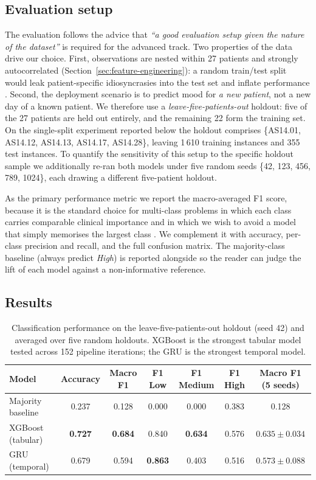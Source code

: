 \subsection{Evaluation setup}\label{sec:classification-eval}

The evaluation follows the advice that \emph{``a good evaluation setup given the nature of the dataset''} is required for the advanced track. Two properties of the data drive our choice. First, observations are nested within 27 patients and strongly autocorrelated (Section~\ref{sec:feature-engineering}): a random train/test split would leak patient-specific idiosyncrasies into the test set and inflate performance \cite{saeb2017need}. Second, the deployment scenario is to predict mood for \textit{a new patient}, not a new day of a known patient. We therefore use a \textit{leave-five-patients-out} holdout: five of the 27 patients are held out entirely, and the remaining 22 form the training set. On the single-split experiment reported below the holdout comprises \{AS14.01, AS14.12, AS14.13, AS14.17, AS14.28\}, leaving 1\,610 training instances and 355 test instances. To quantify the sensitivity of this setup to the specific holdout sample we additionally re-ran both models under five random seeds \{42, 123, 456, 789, 1024\}, each drawing a different five-patient holdout.

As the primary performance metric we report the macro-averaged F1 score, because it is the standard choice for multi-class problems in which each class carries comparable clinical importance and in which we wish to avoid a model that simply memorises the largest class \cite{sokolova2009systematic}. We complement it with accuracy, per-class precision and recall, and the full confusion matrix. The majority-class baseline (always predict \textit{High}) is reported alongside so the reader can judge the lift of each model against a non-informative reference.

\subsection{Results}\label{sec:classification-results}

\begin{table}[h]
\centering
\caption{Classification performance on the leave-five-patients-out holdout (seed 42) and averaged over five random holdouts. XGBoost is the strongest tabular model tested across 152 pipeline iterations; the GRU is the strongest temporal model.}
\label{tab:classification}
\small
\begin{tabular}{@{}lcccccc@{}}
\toprule
Model & Accuracy & Macro F1 & F1 Low & F1 Medium & F1 High & Macro F1 (5 seeds) \\
\midrule
Majority baseline & 0.237 & 0.128 & 0.000 & 0.000 & 0.383 & 0.128 \\
XGBoost (tabular) & \textbf{0.727} & \textbf{0.684} & 0.840 & \textbf{0.634} & 0.576 & $0.635 \pm 0.034$ \\
GRU (temporal) & 0.679 & 0.594 & \textbf{0.863} & 0.403 & 0.516 & $0.573 \pm 0.088$ \\
\bottomrule
\end{tabular}
\end{table}


